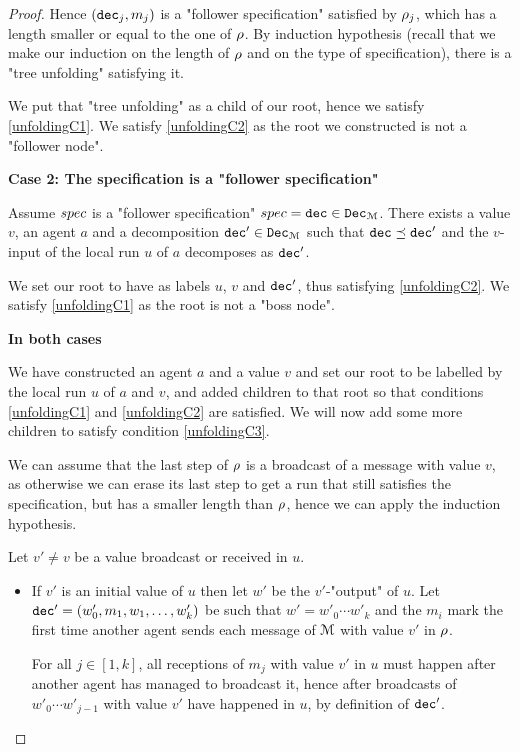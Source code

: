 \begin{proof}
	Hence $(\mathtt{dec}_j, m_j)$ is a "follower specification" satisfied by $\rho_j$, which has a length smaller or equal to the one of $\rho$. By induction hypothesis (recall that we make our induction on the length of $\rho$ and on the type of specification), there is a "tree unfolding" satisfying it.
	
	We put that "tree unfolding" as a child of our root, hence we satisfy \ref{unfoldingC1}. We satisfy \ref{unfoldingC2} as the root we constructed is not a "follower node".
	
	\textbf{Case 2: The specification is a "follower specification"} 
	
	Assume $\spec$ is a "follower specification" $\spec = \decsymb \in \decset{\messages}$. 
	There exists a value $v$, an agent $a$ and a decomposition $\mathtt{dec}' \in \mathtt{Dec}_{\mathcal{M}}$ such that $\mathtt{dec} \preceq \mathtt{dec}'$ and the $v$-input of the local run $u$ of $a$ decomposes as $\mathtt{dec}'$. 
	
	We set our root to have as labels $u$, $v$ and $\mathtt{dec}'$, thus satisfying \ref{unfoldingC2}. We satisfy \ref{unfoldingC1} as the root is not a "boss node".
	
	\textbf{In both cases}
	
	We have constructed an agent $a$ and a value $v$ and set our root to be labelled by the local run $u$ of $a$ and $v$, and added children to that root so that conditions \ref{unfoldingC1} and \ref{unfoldingC2} are satisfied. We will now add some more children to satisfy condition \ref{unfoldingC3}.
	
	We can assume that the last step of $\rho$ is a broadcast of a message with value $v$, as otherwise we can erase its last step to get a run that still satisfies the specification, but has a smaller length than $\rho$, hence we can apply the induction hypothesis.
	
	Let $v' \neq v$ be a value broadcast or received in $u$. 
	
	\begin{itemize}
		\item If $v'$ is an initial value of $u$ then let $w'$ be the $v'$-"output" of $u$. Let $\mathtt{dec}' = (w'_0, m_1, w_1, \ldots, w'_k)$ be such that $w' = w'_0 \cdots w'_k$ and the $m_i$ mark the first time another agent sends each message of $\mathcal{M}$ with value $v'$ in $\rho$.  
		
		For all $j \in [1,k]$, all receptions of $m_j$ with value $v'$ in $u$ must happen after another agent has managed to broadcast it, hence after broadcasts of $w'_0 \cdots w'_{j-1}$ with value $v'$ have happened in $u$, by definition of $\mathtt{dec}'$.
		

\end{itemize}
\end{proof}
